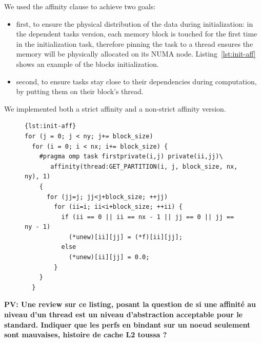 \documentclass{Styles/llncs}
\newcommand{\PV}[1]{{\color{purple}\bfseries PV: #1}}
\begin{document}
We used the affinity clause to achieve two goals:
\begin{itemize}
    \item first, to ensure the physical distribution of the data during initialization:
      in the dependent tasks version, each memory block is touched for the first time
      in the initialization task, therefore pinning the task to a thread ensures
      the memory will be physically allocated on its NUMA node.
      Listing~\ref{lst:init-aff} shows an example of the blocks initialization.
    \item second, to ensure tasks stay close to their dependencies during computation, by putting them on their block's thread.
\end{itemize}


We implemented both a strict affinity and a non-strict affinity version.


\begin{figure}[htbp]
\begin{lstlisting}[caption=Example of use of the affinity clause for initialization,frame=tlrb,style=smaller,label=lst:init-aff]{lst:init-aff}
for (j = 0; j < ny; j+= block_size)
  for (i = 0; i < nx; i+= block_size) {
    #pragma omp task firstprivate(i,j) private(ii,jj)\
       affinity(thread:GET_PARTITION(i, j, block_size, nx, ny), 1)
    {
      for (jj=j; jj<j+block_size; ++jj)
        for (ii=i; ii<i+block_size; ++ii) {
          if (ii == 0 || ii == nx - 1 || jj == 0 || jj == ny - 1)
            (*unew)[ii][jj] = (*f)[ii][jj];
          else
            (*unew)[ii][jj] = 0.0;
        }
    }
  }
\end{lstlisting}
\end{figure}


\PV{Une review sur ce listing, posant la question de si une affinité au niveau d'un thread
est un niveau d'abstraction acceptable pour le standard. Indiquer que les perfs en bindant sur un noeud seulement sont mauvaises, histoire de cache L2 toussa ?}
\end{document}

